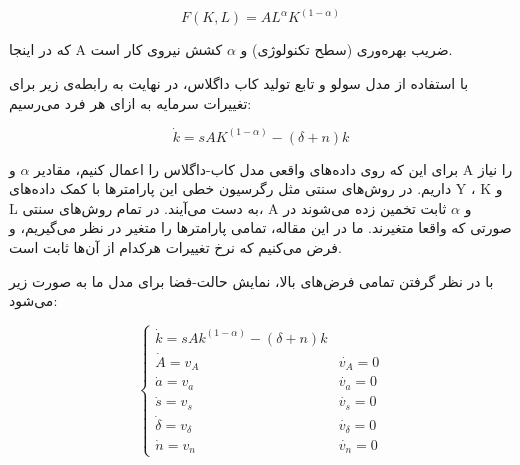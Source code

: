\documentclass[11pt, fleqn]{article}
\begin{document}
\begin{multicols}{2}
\useshortskip
\begin{LTR}
\begin{equation}
F(K, L) = AL^\alpha K^{(1-\alpha)}
\end{equation}
\end{LTR}

که در اینجا A ضریب بهره‌وری
 (سطح تکنولوژی) و 
 $\alpha$
  کشش نیروی‌ کار است.
  
  
با استفاده از مدل سولو و تابع تولید کاب داگلاس، در نهایت به رابطه‌ی زیر برای تغییرات سرمایه به ازای هر فرد می‌رسیم:


\useshortskip
\begin{LTR}
\begin{equation}
\dot{k} = s A K^{(1-\alpha)} - (\delta + n)k
\end{equation}
\end{LTR}



	برای این که روی داده‌های واقعی مدل کاب-داگلاس را اعمال کنیم، مقادیر 
$\alpha$
	و A را نیاز داریم. در روش‌های سنتی مثل رگرسیون خطی این پارامترها با کمک داده‌های
Y
،
K
 و L به دست می‌آیند. در تمام روش‌های سنتی، A و 
 $\alpha$
  ثابت تخمین زده می‌شوند در صورتی که واقعا متغیرند. ما در این مقاله، تمامی پارامتر‌ها را متغیر در نظر می‌گیریم، و فرض می‌کنیم که نرخ تغییرات هرکدام از آن‌ها ثابت است. 

	با در نظر گرفتن تمامی فرض‌های بالا، نمایش حالت-فضا
	 برای مدل ما به صورت زیر می‌شود:

\useshortskip
\begin{LTR}
\begin{equation}
\label{3}
\begin{cases}
\dot{k} = sAk^{(1-\alpha)} - (\delta + n)k

\\

\dot{A} = v_A & \dot{v_A} = 0  

\\

\dot{a} = v_a & \dot{v_a} = 0  

\\

\dot{s} = v_s & \dot{v_s} = 0  

\\

\dot{\delta} = v_\delta & \dot{v_\delta} = 0  

\\

\dot{n} = v_n & \dot{v_n} = 0  


\end{cases}
\end{equation}
\end{LTR}
\end{multicols}
\end{document}
